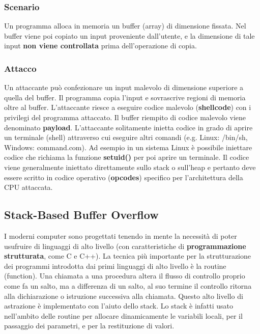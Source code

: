 \subsubsection{Scenario}
Un programma alloca in memoria un buffer (array) di dimensione fissata. Nel buffer viene poi copiato un input proveniente dall'utente, e la dimensione di tale input \textbf{non viene controllata} prima dell'operazione di copia.

\subsubsection{Attacco}
Un attaccante può confezionare un input malevolo di dimensione superiore a quella del buffer. Il programma copia l'input e sovrascrive regioni di memoria oltre al buffer. L'attaccante riesce a eseguire codice malevolo (\textbf{shellcode}) con i privilegi del programma attaccato. Il buffer riempito di codice malevolo viene denominato \textbf{payload}. L'attaccante solitamente inietta codice in grado di aprire un terminale (shell) attraverso cui eseguire altri comandi (e.g. Linux: /bin/sh, Windows: command.com). Ad esempio in un sistema Linux è possibile iniettare codice che richiama la funzione \textbf{setuid()} per poi aprire un terminale. Il codice viene generalmente iniettato direttamente sullo stack o sull'heap e pertanto deve essere scritto in codice operativo (\textbf{opcodes}) specifico per l'architettura della CPU attaccata.

\subsection{Stack-Based Buffer Overflow}
I moderni computer sono progettati tenendo in mente la necessità di poter usufruire di linguaggi di alto livello (con caratteristiche di \textbf{programmazione strutturata}, come C e C++). La tecnica più importante per la strutturazione dei programmi introdotta dai primi linguaggi di alto livello è la routine (function). Una chiamata a una procedura altera il flusso di controllo proprio come fa un salto, ma a differenza di un salto, al suo termine il controllo ritorna alla dichiarazione o istruzione successiva alla chiamata. Questo alto livello di astrazione è implementato con l'aiuto dello stack. Lo stack è infatti usato nell'ambito delle routine per allocare dinamicamente le variabili locali, per il passaggio dei parametri, e per la restituzione di valori. \newline

